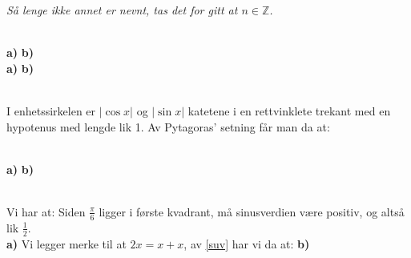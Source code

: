 





\textit{Så lenge ikke annet er nevnt, tas det for gitt at $ n\in \mathbb{Z} $.} \vsk

\\
\textbf{a)}
\textbf{b)}
\\
\textbf{a)}
\textbf{b)}

\\
I enhetssirkelen er $ |\cos x| $ og $ |\sin x| $ katetene i en rettvinklete trekant med en hypotenus med lengde lik 1. Av Pytagoras' setning får man da at:

\newpage
{}\\
\textbf{a)} 
\textbf{b)} 

\\
Vi har at:
Siden $ \frac{\pi}{6} $ ligger i første kvadrant, må sinusverdien være positiv, og altså lik $ \frac{1}{2} $.
\newpage
{}\\
\textbf{a)} Vi legger merke til at $ {2x=x+x} $, av \eqref{suv} har vi da at:
\textbf{b)} 

